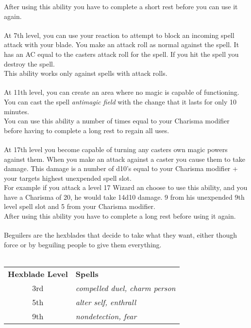 \documentclass[a4paper]{article}
\begin{document}
\begin{multicols}{2}
After using this ability you have to complete a short rest before you can use it again.\\
\\
At 7th level, you can use your reaction to attempt to block an incoming spell attack with your blade. You make an attack roll as normal against the spell. It has an AC equal to the casters attack roll for the spell. If you hit the spell you destroy the spell.\\
This ability works only against spells with attack rolls.\\
\\
At 11th level, you can create an area where no magic is capable of functioning. You can cast the spell \textit{antimagic field} with the change that it lasts for only 10 minutes.\\
You can use this ability a number of times equal to your Charisma modifier before having to complete a long rest to regain all uses.\\
\\
At 17th level you become capable of turning any casters own magic powers against them. When you make an attack against a caster you cause them to take damage. This damage is a number of d10's equal to your Charisma modifier + your targets highest unexpended spell slot.\\
For example if you attack a level 17 Wizard an choose to use this ability, and you have a Charisma of 20, he would take 14d10 damage. 9 from his unexpended 9th level spell slot and 5 from your Charisma modifier.\\
After using this ability you have to complete a long rest before using it again.\\
\\
Beguilers are the hexblades that decide to take what they want, either though force or by beguiling people to give them everything.\\
\\
\begin{tabular}{cp{5cm}}
{\bf Hexblade Level} & {\bf Spells}                         \\
\rowcolor[HTML]{B8EFAD} 
3rd                 & \textit{compelled duel, charm person}\\
5th                 & \textit{alter self, enthrall}\\
\rowcolor[HTML]{B8EFAD} 
9th                 & \textit{nondetection, fear}\\

\end{tabular}
\end{multicols}
\end{document}
